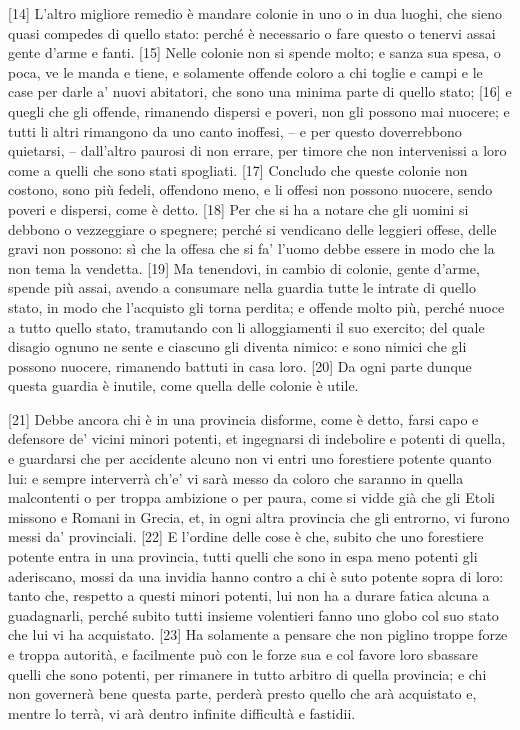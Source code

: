 {[}14{]} L'altro migliore remedio è mandare colonie in uno o in dua
luoghi, che sieno quasi compedes di quello stato: perché è necessario o
fare questo o tenervi assai gente d'arme e fanti. {[}15{]} Nelle colonie
non si spende molto; e sanza sua spesa, o poca, ve le manda e tiene, e
solamente offende coloro a chi toglie e campi e le case per darle a'
nuovi abitatori, che sono una minima parte di quello stato; {[}16{]} e
quegli che gli offende, rimanendo dispersi e poveri, non gli possono mai
nuocere; e tutti li altri rimangono da uno canto inoffesi, -- e per
questo doverrebbono quietarsi, -- dall'altro paurosi di non errare, per
timore che non intervenissi a loro come a quelli che sono stati
spogliati. {[}17{]} Concludo che queste colonie non costono, sono più
fedeli, offendono meno, e li offesi non possono nuocere, sendo poveri e
dispersi, come è detto. {[}18{]} Per che si ha a notare che gli uomini
si debbono o vezzeggiare o spegnere; perché si vendicano delle leggieri
offese, delle gravi non possono: sì che la offesa che si fa' l'uomo
debbe essere in modo che la non tema la vendetta. {[}19{]} Ma tenendovi,
in cambio di colonie, gente d'arme, spende più assai, avendo a consumare
nella guardia tutte le intrate di quello stato, in modo che l'acquisto
gli torna perdita; e offende molto più, perché nuoce a tutto quello
stato, tramutando con li alloggiamenti il suo exercito; del quale
disagio ognuno ne sente e ciascuno gli diventa nimico: e sono nimici che
gli possono nuocere, rimanendo battuti in casa loro. {[}20{]} Da ogni
parte dunque questa guardia è inutile, come quella delle colonie è
utile.

{[}21{]} Debbe ancora chi è in una provincia disforme, come è detto,
farsi capo e defensore de' vicini minori potenti, et ingegnarsi di
indebolire e potenti di quella, e guardarsi che per accidente alcuno non
vi entri uno forestiere potente quanto lui: e sempre interverrà ch'e' vi
sarà messo da coloro che saranno in quella malcontenti o per troppa
ambizione o per paura, come si vidde già che gli Etoli missono e Romani
in Grecia, et, in ogni altra provincia che gli entrorno, vi furono messi
da' provinciali. {[}22{]} E l'ordine delle cose è che, subito che uno
forestiere potente entra in una provincia, tutti quelli che sono in espa
meno potenti gli aderiscano, mossi da una invidia hanno contro a chi è
suto potente sopra di loro: tanto che, respetto a questi minori potenti,
lui non ha a durare fatica alcuna a guadagnarli, perché subito tutti
insieme volentieri fanno uno globo col suo stato che lui vi ha
acquistato. {[}23{]} Ha solamente a pensare che non piglino troppe forze
e troppa autorità, e facilmente può con le forze sua e col favore loro
sbassare quelli che sono potenti, per rimanere in tutto arbitro di
quella provincia; e chi non governerà bene questa parte, perderà presto
quello che arà acquistato e, mentre lo terrà, vi arà dentro infinite
difficultà e fastidii.

